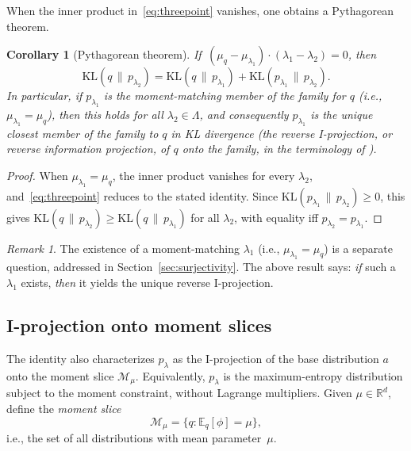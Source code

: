 \documentclass[11pt, a4paper, 
onecolumn, 
showabstract]{naverlabseurope-onecol-flex}
\newtheorem{corollary}[theorem]{Corollary}
\theoremstyle{definition}
\theoremstyle{remark}
\newtheorem{remark}[theorem]{Remark}
\newcommand{\KL}[2]{\mathrm{KL}\!\left(#1 \,\|\, #2\right)}
\newcommand{\E}{\mathbb{E}}
\newcommand{\R}{\mathbb{R}}
\newcommand{\cM}{\mathcal{M}}
\begin{document}
When the inner product in~\eqref{eq:threepoint} vanishes, one obtains a Pythagorean theorem.

\begin{corollary}[Pythagorean theorem]\label{cor:pythagoras}
If\, $(\mu_q - \mu_{\lambda_1}) \cdot (\lambda_1 - \lambda_2) = 0$, then
\[
    \KL{q}{p_{\lambda_2}} = \KL{q}{p_{\lambda_1}} + \KL{p_{\lambda_1}}{p_{\lambda_2}}.
\]
In particular, if $p_{\lambda_1}$ is the moment-matching member of the family for $q$ (i.e., $\mu_{\lambda_1} = \mu_q$), then this holds for all $\lambda_2 \in \Lambda$, and consequently $p_{\lambda_1}$ is the unique closest member of the family to $q$ in KL divergence (the \emph{reverse I-projection}, or \emph{reverse information projection}, of $q$ onto the family, in the terminology of \cite{CsiszarMatus2003}).
\end{corollary}

\begin{proof}
When $\mu_{\lambda_1} = \mu_q$, the inner product vanishes for every $\lambda_2$, and~\eqref{eq:threepoint} reduces to the stated identity.
Since $\KL{p_{\lambda_1}}{p_{\lambda_2}} \geq 0$, this gives $\KL{q}{p_{\lambda_2}} \geq \KL{q}{p_{\lambda_1}}$ for all $\lambda_2$, with equality iff $p_{\lambda_2} = p_{\lambda_1}$.
\end{proof}

\begin{remark}
The existence of a moment-matching $\lambda_1$ (i.e., $\mu_{\lambda_1} = \mu_q$) is a separate question, addressed in Section~\ref{sec:surjectivity}. The above result says: \emph{if} such a $\lambda_1$ exists, \emph{then} it yields the unique reverse I-projection.
\end{remark}

\subsection{I-projection onto moment slices}\label{sec:maxent}

The identity also characterizes $p_\lambda$ as the I-projection of the base distribution $a$ onto the moment slice $\cM_\mu$.
Equivalently, $p_\lambda$ is the maximum-entropy distribution subject to the moment constraint, without Lagrange multipliers.
Given $\mu \in \R^d$, define the \emph{moment slice}
\[
    \cM_\mu = \{q : \E_q[\phi] = \mu\},
\]
i.e., the set of all distributions with mean parameter~$\mu$.
\end{document}
